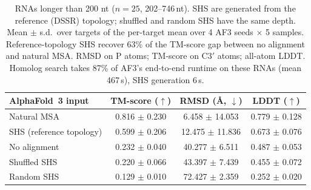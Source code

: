 \begin{table}[t]
\centering
\caption{RNAs longer than 200 nt ($n{=}25$, 202--746\,nt). SHS are generated from the reference (DSSR) topology; shuffled and random SHS have the same depth. Mean $\pm$ s.d.\ over targets of the per-target mean over 4 AF3 seeds $\times$ 5 samples. Reference-topology SHS recover 63\% of the TM-score gap between no alignment and natural MSA. RMSD on P atoms; TM-score on C3$'$ atoms; all-atom LDDT. Homolog search takes 87\% of AF3's end-to-end runtime on these RNAs (mean 467\,s), SHS generation 6\,s.}
\label{tab:long_rna}
\begin{tabular}{lccc}
\toprule
AlphaFold~3 input & TM-score ($\uparrow$) & RMSD (\AA, $\downarrow$) & LDDT ($\uparrow$) \\
\midrule
Natural MSA & 0.816 $\pm$ 0.230 & 6.458 $\pm$ 14.053 & 0.779 $\pm$ 0.128 \\
SHS (reference topology) & 0.599 $\pm$ 0.206 & 12.475 $\pm$ 11.836 & 0.673 $\pm$ 0.076 \\
No alignment & 0.232 $\pm$ 0.040 & 40.277 $\pm$ 6.511 & 0.487 $\pm$ 0.053 \\
Shuffled SHS & 0.220 $\pm$ 0.066 & 43.397 $\pm$ 7.439 & 0.455 $\pm$ 0.072 \\
Random SHS & 0.129 $\pm$ 0.010 & 72.427 $\pm$ 2.359 & 0.252 $\pm$ 0.020 \\
\bottomrule
\end{tabular}
\end{table}

\begin{table}[t]
\centering
\caption{Post-cutoff orphans: RNAformer-seeded SHS vs.\ natural MSA. Paired differences of per-target means (4 AF3 seeds $\times$ 5 samples), 5000$\times$ bootstrap 95\% CI and Wilcoxon signed-rank $p$. Neither difference is significant; SHS and natural MSAs are on par in this regime.}
\label{tab:orphan_tests}
\end{table}

